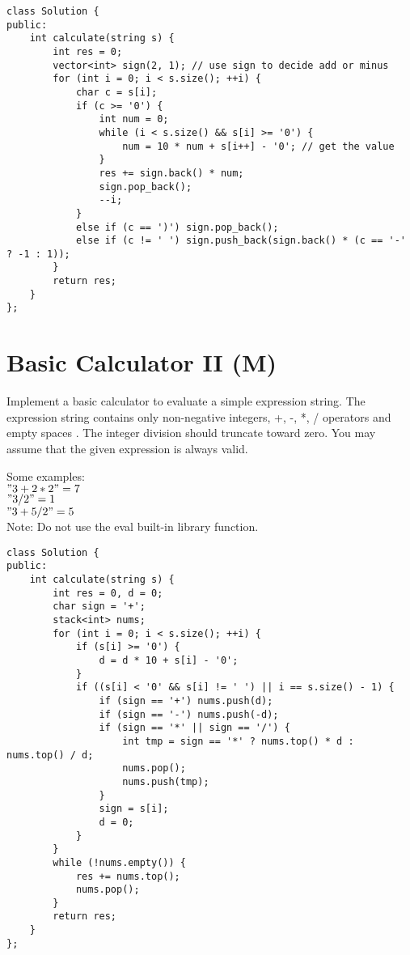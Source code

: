 \begin{lstlisting}
class Solution {
public:
    int calculate(string s) {
        int res = 0;
        vector<int> sign(2, 1); // use sign to decide add or minus
        for (int i = 0; i < s.size(); ++i) {
            char c = s[i];
            if (c >= '0') {
                int num = 0;
                while (i < s.size() && s[i] >= '0') {
                    num = 10 * num + s[i++] - '0'; // get the value
                }
                res += sign.back() * num;
                sign.pop_back();
                --i;
            }
            else if (c == ')') sign.pop_back();
            else if (c != ' ') sign.push_back(sign.back() * (c == '-' ? -1 : 1));
        }
        return res;
    }
};
\end{lstlisting}


\section{Basic Calculator II (M)}
Implement a basic calculator to evaluate a simple expression string. The expression string contains only non-negative integers, +, -, *, / operators and empty spaces . The integer division should truncate toward zero. You may assume that the given expression is always valid.

Some examples:\\
$"3+2*2" = 7$\\
$" 3/2 " = 1$\\
$" 3+5 / 2 " = 5$\\

Note: Do not use the eval built-in library function. \\

\begin{lstlisting}
class Solution {
public:
    int calculate(string s) {
        int res = 0, d = 0;
        char sign = '+';
        stack<int> nums;
        for (int i = 0; i < s.size(); ++i) {
            if (s[i] >= '0') {
                d = d * 10 + s[i] - '0';
            }
            if ((s[i] < '0' && s[i] != ' ') || i == s.size() - 1) {
                if (sign == '+') nums.push(d);
                if (sign == '-') nums.push(-d);
                if (sign == '*' || sign == '/') {
                    int tmp = sign == '*' ? nums.top() * d : nums.top() / d;
                    nums.pop();
                    nums.push(tmp);
                }
                sign = s[i];
                d = 0;
            } 
        }
        while (!nums.empty()) {
            res += nums.top();
            nums.pop();
        }
        return res;
    }
};
\end{lstlisting}


